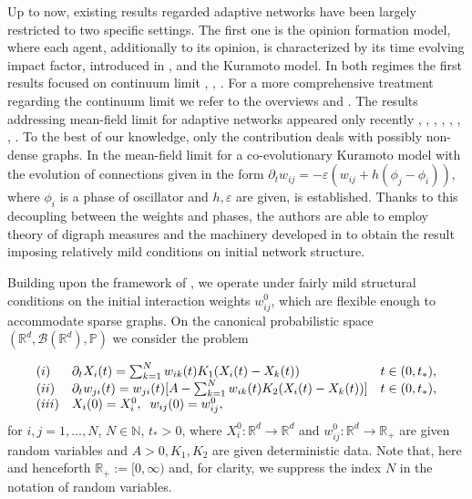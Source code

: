 \documentclass[10pt]{article}
\newcommand{\hd}{\hspace{0.2cm}}
\newcommand{\ve}{\varepsilon}
\newcommand{\R}{\mathbb{R}}
\newcommand{\p}{\mathbb{P}}
\newcommand{\wij}{w_{ij}}
\newcommand{\wji}{w_{ji}}
\begin{document}
Up to now, existing results regarded adaptive networks have been largely restricted to two specific settings. The first one is the opinion formation model, where each agent, additionally to its opinion, is characterized by its time evolving impact factor, introduced in  \cite{MPD2019}, and the Kuramoto model. In both regimes the first results focused on continuum limit \cite{AD2021},   \cite{GKX2023}, \cite{Throm}. For a more comprehensive treatment regarding the continuum limit we refer to the overviews \cite{Aover} and \cite{ADover}. The results addressing mean-field limit for adaptive networks appeared only recently \cite{A2026}, \cite{AD2021}, \cite{BCG2024}, \cite{Poyato2026}, \cite{D2022}, \cite{GKX2025},  \cite{Throm2},  \cite{Zhou}. To the best of our knowledge, only the contribution \cite{GKX2025} deals with possibly non-dense graphs. In \cite{GKX2025}  the mean-field limit for a co-evolutionary Kuramoto model with the evolution of connections given in the form $\partial_t w_{ij} = -\ve(w_{ij} + h(\phi_j - \phi_i))$, where $\phi_i$ is a phase of oscillator and $h,\ve$ are given, is established. Thanks to this decoupling between the weights and phases, the authors are able to   
employ theory of digraph measures and the machinery developed in \cite{Kuehn} to obtain the result imposing relatively mild conditions on initial network structure.

Building upon the framework of \cite{JPS2025}, we operate under fairly mild structural conditions on the initial interaction weights $w_{ij}^0$, which are flexible enough to accommodate sparse graphs. On the canonical probabilistic space $(\R^d,\mathcal{B}(\R^d),\p)$ we consider the problem

\begin{equation}\label{part}
\begin{array}{lll}
(i) & \partial_t X_i(t) = \sum_{k=1}^N w_{ik}(t) K_{1}(X_i(t)-X_k(t)) & t \in (0,t_*),\\
(ii) & \partial_t \wji(t) = \wji(t)[A-\sum_{k=1}^N w_{ik}(t)K_{2}(X_i(t)-X_k(t))] & t \in  (0,t_*),\\
(iii) & X_i(0) = X_{i}^0, \hd  \wij(0) = \wij^0,
\end{array}
\end{equation}
for $i,j=1,\dots, N$, $N \in \mathbb{N}$, $t_* > 0$,  where $X_i^0:\mathbb{R}^d \rightarrow \mathbb{R}^d $ and $\wij^0:\mathbb{R}^d\rightarrow \mathbb{R}_{+}$ are given random variables and $A>0,K_1,K_2$ are given deterministic data. Note that, here and henceforth $\R_{+}:=[0,\infty)$ and, for clarity, we suppress the index $N$ in the notation of random variables. \\
\end{document}
